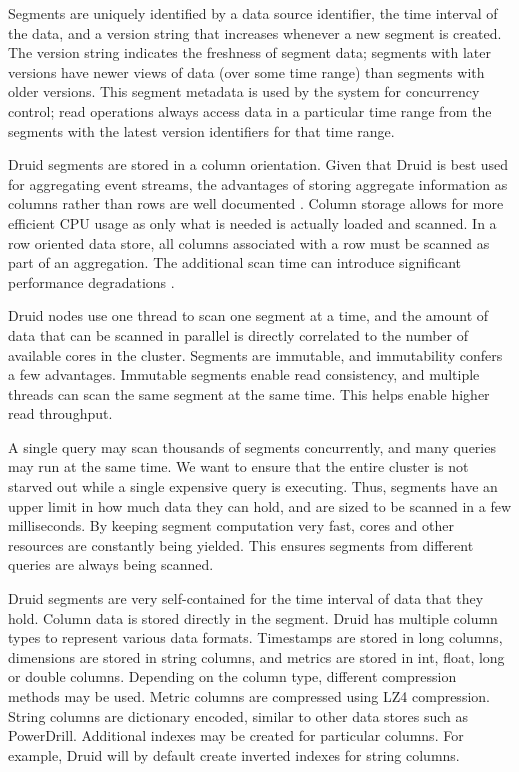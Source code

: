 \documentclass{vldb}
\begin{document}
Segments are uniquely identified by a data source identifier, the time interval
of the data, and a version string that increases whenever a new segment is
created. The version string indicates the freshness of segment data; segments
with later versions have newer views of data (over some time range) than
segments with older versions. This segment metadata is used by the system for
concurrency control; read operations always access data in a particular time
range from the segments with the latest version identifiers for that time
range.

Druid segments are stored in a column orientation. Given that Druid is best
used for aggregating event streams, the advantages of storing aggregate
information as columns rather than rows are well documented
\cite{abadi2008column}. Column storage allows for more efficient CPU usage as
only what is needed is actually loaded and scanned.  In a row oriented data
store, all columns associated with a row must be scanned as part of an
aggregation. The additional scan time can introduce significant performance
degradations \cite{abadi2008column}.

Druid nodes use one thread to scan one segment at a time, and the amount of
data that can be scanned in parallel is directly correlated to the number of
available cores in the cluster. Segments are immutable, and immutability
confers a few advantages. Immutable segments enable read consistency, and
multiple threads can scan the same segment at the same time. This helps enable
higher read throughput. 

A single query may scan thousands of segments concurrently, and
many queries may run at the same time. We want to ensure that the entire
cluster is not starved out while a single expensive query is executing. Thus,
segments have an upper limit in how much data they can hold, and are sized
to be scanned in a few milliseconds. By keeping segment computation very fast,
cores and other resources are constantly being yielded. This ensures segments
from different queries are always being scanned.

Druid segments are very self-contained for the time interval of data that they
hold. Column data is stored directly in the segment. Druid has multiple column
types to represent various data formats. Timestamps are stored in long columns,
dimensions are stored in string columns, and metrics are stored in int, float,
long or double columns. Depending on the column type, different compression
methods may be used. Metric columns are compressed using
LZ4\cite{collet2013lz4} compression. String columns are dictionary encoded,
similar to other data stores such as PowerDrill\cite{hall2012processing}.
Additional indexes may be created for particular columns. For example, Druid
will by default create inverted indexes for string columns.
\end{document}
